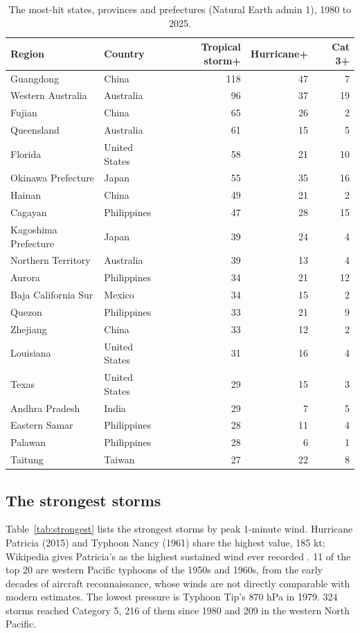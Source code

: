 \documentclass[11pt,a4paper]{article}
\begin{document}
\begin{table}[tbp]\centering\small\caption{The most-hit states, provinces and prefectures (Natural Earth admin 1), 1980 to 2025.}\label{tab:regions}\begin{tabular}{llrrr}\toprule Region & Country & Tropical storm+ & Hurricane+ & Cat 3+\\\midrule
Guangdong & China & 118 & 47 & 7\\
Western Australia & Australia & 96 & 37 & 19\\
Fujian & China & 65 & 26 & 2\\
Queensland & Australia & 61 & 15 & 5\\
Florida & United States & 58 & 21 & 10\\
Okinawa Prefecture & Japan & 55 & 35 & 16\\
Hainan & China & 49 & 21 & 2\\
Cagayan & Philippines & 47 & 28 & 15\\
Kagoshima Prefecture & Japan & 39 & 24 & 4\\
Northern Territory & Australia & 39 & 13 & 4\\
Aurora & Philippines & 34 & 21 & 12\\
Baja California Sur & Mexico & 34 & 15 & 2\\
Quezon & Philippines & 33 & 21 & 9\\
Zhejiang & China & 33 & 12 & 2\\
Louisiana & United States & 31 & 16 & 4\\
Texas & United States & 29 & 15 & 3\\
Andhra Pradesh & India & 29 & 7 & 5\\
Eastern Samar & Philippines & 28 & 11 & 4\\
Palawan & Philippines & 28 & 6 & 1\\
Taitung & Taiwan & 27 & 22 & 8\\
\bottomrule\end{tabular}\end{table}

\subsection{The strongest storms}
Table~\ref{tab:strongest} lists the strongest storms by peak 1-minute wind. Hurricane Patricia (2015) and Typhoon Nancy (1961) share the highest value, 185 kt; Wikipedia gives Patricia's as the highest sustained wind ever recorded \citep{wikitc}. 11 of the top 20 are western Pacific typhoons of the 1950s and 1960s, from the early decades of aircraft reconnaissance, whose winds are not directly comparable with modern estimates. The lowest pressure is Typhoon Tip's 870 hPa in 1979. 324 storms reached Category 5, 216 of them since 1980 and 209 in the western North Pacific.
\end{document}
